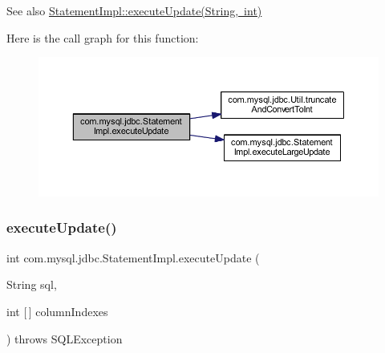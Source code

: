 \begin{DoxySeeAlso}{See also}
\mbox{\hyperlink{classcom_1_1mysql_1_1jdbc_1_1_statement_impl_ab13499dab119bd6814990fb5c64b3463}{Statement\+Impl\+::execute\+Update(\+String, int)}} 
\end{DoxySeeAlso}
Here is the call graph for this function\+:
\nopagebreak
\begin{figure}[H]
\begin{center}
\leavevmode
\includegraphics[width=350pt]{classcom_1_1mysql_1_1jdbc_1_1_statement_impl_ab13499dab119bd6814990fb5c64b3463_cgraph}
\end{center}
\end{figure}
\mbox{\label{classcom_1_1mysql_1_1jdbc_1_1_statement_impl_a9ec4107597d72e74f9c21a05108d73b0}} 
\subsubsection{\texorpdfstring{execute\+Update()}{executeUpdate()}\hspace{0.1cm}{\footnotesize\ttfamily [3/4]}}
{\footnotesize\ttfamily int com.\+mysql.\+jdbc.\+Statement\+Impl.\+execute\+Update (\begin{DoxyParamCaption}\item[{String}]{sql,  }\item[{int \mbox{[}$\,$\mbox{]}}]{column\+Indexes }\end{DoxyParamCaption}) throws S\+Q\+L\+Exception}

